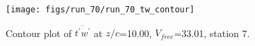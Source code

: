 \begin{figure}[H]
\centering
\texttt{[image: figs/run\_70/run\_70\_tw\_contour]}
\caption{Contour plot of $\overline{t^\prime w^\prime}$ at $z/c$=10.00, $V_{free}$=33.01, station 7.}
\end{figure}


